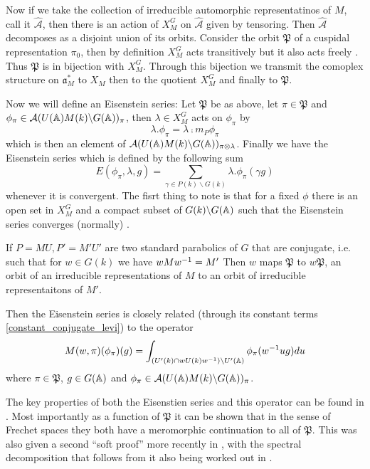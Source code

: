 Now if we take the collection of irreducible automorphic representatinos of \(M\), call it \(\hat{\mathcal{A}}\), then there is an action of \(X_M^G\) on \(\hat{\mathcal{A}}\) given by tensoring. Then \(\hat{\mathcal{A}}\) decomposes as a disjoint union of its orbits. Consider the orbit \(\mathfrak{P}\) of a cuspidal representation \(\pi_0\), then by definition \(X_M^G\) acts transitively but it also acts freely \cite[II.1]{moeglinSpectralDecompositionEisenstein1995}. Thus \(\mathfrak{P}\) is in bijection with \(X_M^G\). Through this bijection we transmit the comoplex structure on \(\mathfrak{a}_M^*\) to \(X_M\) then to the quotient \(X_M^G\) and finally to \(\mathfrak{P}\).

Now we will define an Eisenstein series: Let \(\mathfrak{P}\) be as above, let \(\pi\in \mathfrak{P}\) and \(\phi_\pi \in \mathcal{A}(U(\A)M(k)\backslash G(\A))_\pi\), then \(\lambda\in X_M^G\) acts on \(\phi_\pi\) by 
\[\lambda.\phi_\pi = \lambda \comp m_P\phi_\pi\]
which is then an element of \(\mathcal{A}(U(\A)M(k)\backslash G(\A))_{\pi\tensor \lambda}\). Finally we have the Eisenstein series which is defined by the following sum
\[E(\phi_\pi, \lambda, g) = \sum_{\gamma \in P(k)\backslash G(k)} \lambda.\phi_\pi(\gamma g)\]
whenever it is convergent. The fisrt thing to note is that for a fixed \(\phi\) there is an open set in \(X_M^G\) and a compact subset of \(G(k)\backslash G(\A)\) such that the Eisenstein series converges (normally) \cite[II.1.5]{moeglinSpectralDecompositionEisenstein1995}.

If \(P = MU, P' = M'U'\) are two standard parabolics of \(G\) that are conjugate, i.e. such that for \(w\in G(k)\) we have \(wMw^{-1} = M'\)
Then \(w\) maps \(\mathfrak{P}\) to \(w\mathfrak{P}\), an orbit of an irreducible representations of \(M\) to an orbit of irreducible representaitons of \(M'\).

Then the Eisenstein series is closely related (through its constant terms \ref{constant_conjugate_levi}) to the operator
\[M(w, \pi)(\phi_\pi)(g) = \int_{(U'(k)\cap wU(k)w\inv )\backslash U'(\A)} \phi_\pi(w\inv ug) du\]
where \(\pi\in \mathfrak{P}\), \(g\in G(\A)\) and \(\phi_\pi \in \mathcal{A}(U(\A)M(k)\backslash G(\A))_\pi\).

The key properties of both the Eisenstien series and this operator can be found in \cite[IV.1.8, IV.1.9, IV.1.10, IV.1.11]{moeglinSpectralDecompositionEisenstein1995}. Most importantly as a function of \(\mathfrak{P}\) it can be shown that in the sense of Frechet spaces they both have a meromorphic continuation to all of \(\mathfrak{P}\). This was also given a second ``soft proof'' more recently in \cite{bernsteinMeromorphicContinuationEisenstein2022}, with the spectral decomposition that follows from it also being worked out in \cite{delormeSpectralTheoremLanglands2021}.

